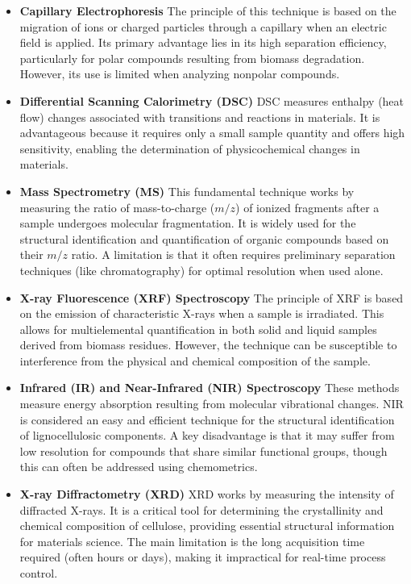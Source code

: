 \begin{itemize}
\item \textbf{Capillary Electrophoresis} The principle of this technique is based on the migration of ions or charged particles through a capillary when an electric field is applied. Its primary advantage lies in its high separation efficiency, particularly for polar compounds resulting from biomass degradation. However, its use is limited when analyzing nonpolar compounds.
\item \textbf{Differential Scanning Calorimetry (DSC)} DSC measures enthalpy (heat flow) changes associated with transitions and reactions in materials. It is advantageous because it requires only a small sample quantity and offers high sensitivity, enabling the determination of physicochemical changes in materials.
\item \textbf{Mass Spectrometry (MS)} This fundamental technique works by measuring the ratio of mass-to-charge ($m/z$) of ionized fragments after a sample undergoes molecular fragmentation. It is widely used for the structural identification and quantification of organic compounds based on their $m/z$ ratio. A limitation is that it often requires preliminary separation techniques (like chromatography) for optimal resolution when used alone.
\item \textbf{X-ray Fluorescence (XRF) Spectroscopy} The principle of XRF is based on the emission of characteristic X-rays when a sample is irradiated. This allows for multielemental quantification in both solid and liquid samples derived from biomass residues. However, the technique can be susceptible to interference from the physical and chemical composition of the sample.
\item \textbf{Infrared (IR) and Near-Infrared (NIR) Spectroscopy} These methods measure energy absorption resulting from molecular vibrational changes. NIR is considered an easy and efficient technique for the structural identification of lignocellulosic components. A key disadvantage is that it may suffer from low resolution for compounds that share similar functional groups, though this can often be addressed using chemometrics.
\item \textbf{X-ray Diffractometry (XRD)} XRD works by measuring the intensity of diffracted X-rays. It is a critical tool for determining the crystallinity and chemical composition of cellulose, providing essential structural information for materials science. The main limitation is the long acquisition time required (often hours or days), making it impractical for real-time process control.

\end{itemize}
